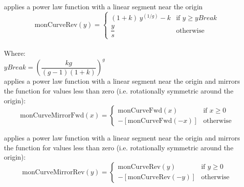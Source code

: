 \begin{xmlfields}
\begin{xmlfields}
            \xmlitemd["monCurveRev"] applies a power law function with a linear segment near the origin 
                \begin{equation} \label{eq:expmonCurveRev}
                    \text{monCurveRev}(y) = 
                        \begin{cases}
                            (1 + k)\:y^{(1/g)} - k & \text{if } y \geq yBreak \\[8pt]
                            \dfrac{y}{s} & \text{otherwise}
                        \end{cases}
                \end{equation} \\[4pt]
                \tabto{0.5in} Where: \\[4pt]
                \tabto{1.0in} $yBreak = \left(\dfrac{k g}{(g-1)(1+k)}\right)^g$ \\[26pt]
            
            \xmlitemd["monCurveMirrorFwd"] applies a power law function with a linear segment near the origin and mirrors the function for values less than zero (i.e. rotationally symmetric around the origin):
                \begin{equation} \label{eq:expmonCurveMirrorFwd}
                    \text{monCurveMirrorFwd}(x) = 
                        \begin{cases}
                            \text{monCurveFwd}(x) & \text{if } x \geq 0 \\[8pt]
                            -[\text{monCurveFwd}(-x)] & \text{otherwise}
                        \end{cases}
                \end{equation}
            
            \xmlitemd["monCurveMirrorRev"] applies a power law function with a linear segment near the origin and mirrors the function for values less than zero (i.e. rotationally symmetric around the origin):
                \begin{equation} \label{eq:expmonCurveMirrorRev}
                    \text{monCurveMirrorRev}(y) = 
                        \begin{cases}
                            \text{monCurveRev}(y) & \text{if } y \geq 0 \\[8pt]
                            -[\text{monCurveRev}(-y)] & \text{otherwise}
                        \end{cases}
                \end{equation}      
            
            \end{xmlfields}
\end{xmlfields}
            

